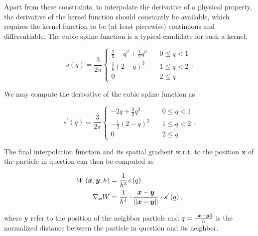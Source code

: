 \documentclass[
	11pt, 
	DIV10,
	ngerman,
	a4paper, 
	oneside, 
	headings=normal, 
	captions=tableheading,
	final, 
	numbers=noenddot
]{scrartcl}
\DeclarePairedDelimiter{\norm}{\lVert}{\rVert}
\begin{document}
Apart from these constraints, to interpolate the derivative of a physical property, the derivative of the kernel function should constantly be available, which requires the kernel function to be (at least piecewise) continuous and differentiable. The cubic spline function is a typical candidate for such a kernel:

\begin{equation}
	\label{eq10}
	s\left(q\right) = \frac{3}{2\pi}\left\{
	\begin{array}{ll}
            \frac{2}{3} - q^{2} + \frac{1}{2}q^{3}	& \quad 0 \leq q < 1 \\[1em]
            \frac{1}{6}\left(2 - q\right)^{3}		& \quad 1 \leq q < 2 \\[1em]
            0	& \quad 2 \leq q
    \end{array}
    \right..
\end{equation}

We may compute the derivative of the cubic spline function as

\begin{equation}
	\label{eq11}
	s^{\prime}\left(q\right) = \frac{3}{2\pi}\left\{
	\begin{array}{ll}
            -2q + \frac{3}{2}q^{2}					& \quad 0 \leq q < 1 \\[1em]
            -\frac{1}{2}\left(2 - q\right)^{2}		& \quad 1 \leq q < 2 \\[1em]
            0	& \quad 2 \leq q
    \end{array}
    \right..
\end{equation}

The final interpolation function and its spatial gradient w.r.t. to the position $ \boldsymbol{x} $ of the particle in question can then be computed as

\begin{equation}
\begin{split}
	\label{eq12}
	W\left(\boldsymbol{x}, \boldsymbol{y}, h\right) &= \frac{1}{h^{3}}s\left(q\right) \\
	\nabla_{\boldsymbol{x}} W &= \frac{1}{h^{4}} \cdot \frac{\boldsymbol{x} - \boldsymbol{y}}{\norm{\boldsymbol{x} - \boldsymbol{y}}} \cdot s^{\prime}\left(q\right),
\end{split}
\end{equation}

where $ \boldsymbol{y} $ refer to the position of the neighbor particle and $ q = \frac{\norm{\boldsymbol{x} - \boldsymbol{y}}}{h} $ is the normalized distance between the particle in question and its neighbor.
\end{document}
